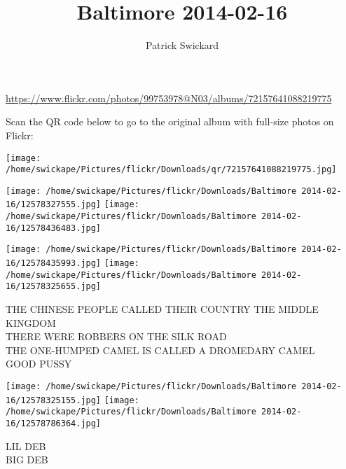 \documentclass[10pt,letterpaper]{article}
\title{Baltimore 2014-02-16}
\author{Patrick Swickard}
\date{}
\begin{document}
\maketitle

\url{https://www.flickr.com/photos/99753978@N03/albums/72157641088219775}

Scan the QR code below to go to the original album with full-size photos on Flickr:

\texttt{[image: /home/swickape/Pictures/flickr/Downloads/qr/72157641088219775.jpg]}
\pagebreak

\texttt{[image: /home/swickape/Pictures/flickr/Downloads/Baltimore 2014-02-16/12578327555.jpg]}
\texttt{[image: /home/swickape/Pictures/flickr/Downloads/Baltimore 2014-02-16/12578436483.jpg]}

\texttt{[image: /home/swickape/Pictures/flickr/Downloads/Baltimore 2014-02-16/12578435993.jpg]}
\texttt{[image: /home/swickape/Pictures/flickr/Downloads/Baltimore 2014-02-16/12578325655.jpg]}

THE CHINESE PEOPLE CALLED THEIR COUNTRY THE MIDDLE KINGDOM\\
THERE WERE ROBBERS ON THE SILK ROAD\\
THE ONE{-}HUMPED CAMEL IS CALLED A DROMEDARY CAMEL\\
GOOD PUSSY
\pagebreak

\texttt{[image: /home/swickape/Pictures/flickr/Downloads/Baltimore 2014-02-16/12578325155.jpg]}
\texttt{[image: /home/swickape/Pictures/flickr/Downloads/Baltimore 2014-02-16/12578786364.jpg]}

LIL DEB\\
BIG DEB
\pagebreak
\end{document}
